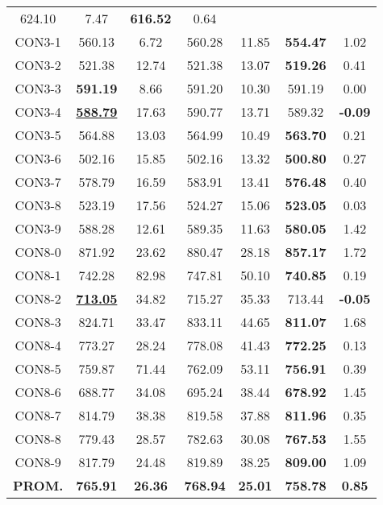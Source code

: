 \begin{table}[ht]
\begin{tabular}{c c c c c c c}
624.10 & 7.47 & \bf{616.52} & 
0.64\\CON3-1 & 560.13 & 6.72 & 
560.28 & 11.85 & \bf{554.47} & 
1.02\\CON3-2 & 521.38 & 12.74 & 
521.38 & 13.07 & \bf{519.26} & 
0.41\\CON3-3 & \bf{591.19} & 8.66 & 
591.20 & 10.30 & 591.19 & 0.00\\
CON3-4 & \bf{\underline{588.79}} & 17.63 & 
590.77 & 13.71 & 589.32 & 
\bf{-0.09}\\CON3-5 & 564.88 & 13.03 & 
564.99 & 10.49 & \bf{563.70} & 
0.21\\CON3-6 & 502.16 & 15.85 & 
502.16 & 13.32 & \bf{500.80} & 
0.27\\CON3-7 & 578.79 & 16.59 & 
583.91 & 13.41 & \bf{576.48} & 
0.40\\CON3-8 & 523.19 & 17.56 & 
524.27 & 15.06 & \bf{523.05} & 
0.03\\CON3-9 & 588.28 & 12.61 & 
589.35 & 11.63 & \bf{580.05} & 
1.42\\CON8-0 & 871.92 & 23.62 & 
880.47 & 28.18 & \bf{857.17} & 
1.72\\CON8-1 & 742.28 & 82.98 & 
747.81 & 50.10 & \bf{740.85} & 
0.19\\CON8-2 & \bf{\underline{713.05}} & 34.82 & 
715.27 & 35.33 & 713.44 & 
\bf{-0.05}\\CON8-3 & 824.71 & 33.47 & 
833.11 & 44.65 & \bf{811.07} & 
1.68\\CON8-4 & 773.27 & 28.24 & 
778.08 & 41.43 & \bf{772.25} & 
0.13\\CON8-5 & 759.87 & 71.44 & 
762.09 & 53.11 & \bf{756.91} & 
0.39\\CON8-6 & 688.77 & 34.08 & 
695.24 & 38.44 & \bf{678.92} & 
1.45\\CON8-7 & 814.79 & 38.38 & 
819.58 & 37.88 & \bf{811.96} & 
0.35\\CON8-8 & 779.43 & 28.57 & 
782.63 & 30.08 & \bf{767.53} & 
1.55\\CON8-9 & 817.79 & 24.48 & 
819.89 & 38.25 & \bf{809.00} & 
1.09\\\bf{PROM.} & 
\bf{765.91} & \bf{26.36} & \bf{768.94} & \bf{25.01} & \bf{758.78} & \bf{0.85}\\[1ex]\hline
\end{tabular}
\label{table:nonlin}
\end{table} \clearpage
